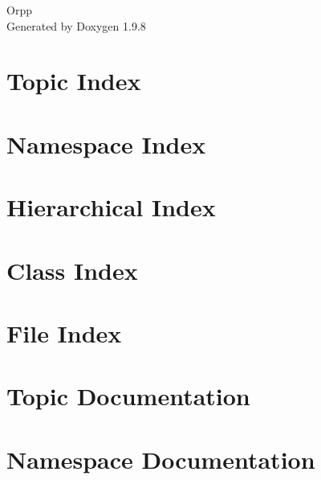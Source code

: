 \documentclass[twoside]{book}
\newcommand{\+}{\discretionary{\mbox{\scriptsize$\hookleftarrow$}}{}{}}
\newcommand{\clearemptydoublepage}{%
    \newpage{\pagestyle{empty}\cleardoublepage}%
  }
\begin{document}
  \raggedbottom
    \hypersetup{pageanchor=false,
                bookmarksnumbered=true,
                pdfencoding=unicode
               }
  \begin{titlepage}
  \vspace*{7cm}
  \begin{center}%
  {\Large Orpp}\\
  \vspace*{1cm}
  {\large Generated by Doxygen 1.9.8}\\
  \end{center}
  \end{titlepage}
  \clearemptydoublepage
  \tableofcontents
  \clearemptydoublepage
  \hypersetup{pageanchor=true}
\chapter{Topic Index}

\chapter{Namespace Index}

\chapter{Hierarchical Index}

\chapter{Class Index}

\chapter{File Index}

\chapter{Topic Documentation}







\chapter{Namespace Documentation}

\end{document}
